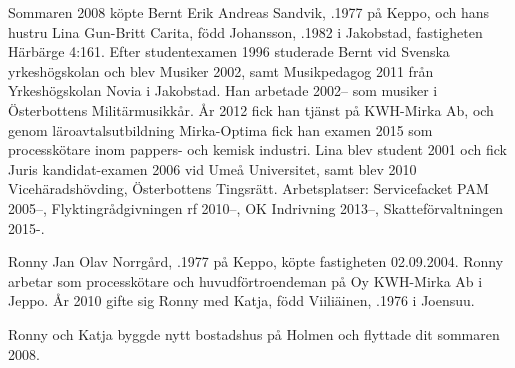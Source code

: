 Sommaren 2008 köpte Bernt Erik Andreas Sandvik, .1977 på Keppo, och hans hustru Lina Gun-Britt Carita, född Johansson, .1982 i Jakobstad, fastigheten Härbärge 4:161. Efter studentexamen 1996 studerade Bernt vid Svenska yrkeshögskolan och blev Musiker 2002, samt Musikpedagog 2011 från Yrkeshögskolan Novia 	i Jakobstad. Han arbetade 2002-- som musiker i Österbottens Militärmusikkår. År 2012 fick han tjänst på KWH-Mirka Ab, och genom 	läroavtalsutbildning Mirka-Optima fick han examen 2015 som processkötare inom pappers- och kemisk industri. Lina blev student 2001 och fick Juris kandidat-examen 2006 vid Umeå Universitet, samt	blev 2010 Vicehäradshövding, Österbottens Tingsrätt. Arbetsplatser: Servicefacket PAM 2005--, Flyktingrådgivningen rf 2010--, OK Indrivning 2013--, Skatteförvaltningen 2015-.
\begin{jhchildren}
  \item {}
  \item {}
  \item {}
  \item {}
\end{jhchildren}


Ronny Jan Olav Norrgård, .1977 på Keppo, köpte	fastigheten 02.09.2004. Ronny arbetar som processkötare och huvudförtroendeman på Oy KWH-Mirka Ab i Jeppo. År 2010 gifte sig Ronny med Katja, född Viiliäinen, .1976 i Joensuu.
\begin{jhchildren}
  \item {}
  \item {}
  \item {}
\end{jhchildren}
Ronny och Katja byggde nytt bostadshus på Holmen och flyttade dit sommaren 2008.


